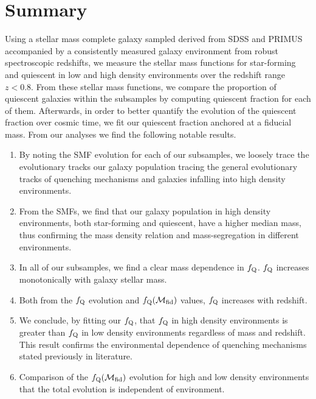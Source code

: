 \documentclass{emulateapj}
\begin{document}
\section{Summary} \label{sec:summary}
Using a stellar mass complete galaxy sampled derived from SDSS and PRIMUS accompanied by a consistently measured galaxy environment from robust spectroscopic redshifts, we measure the stellar mass functions for star-forming and quiescent in low and high density environments over the redshift range $z < 0.8$. From these stellar mass functions, we compare the proportion of quiescent galaxies within the subsamples by computing quiescent fraction for each of them. Afterwards, in order to better quantify the evolution of the quiescent fraction over cosmic time, we fit our quiescent fraction anchored at a fiducial mass. From our analyses we find the following notable results. 

\begin{enumerate}
	\item By noting the SMF evolution for each of our subsamples, we loosely trace the evolutionary tracks our galaxy population tracing the general evolutionary tracks of quenching mechanisms and galaxies infalling into high density environments. 
	\item From the SMFs, we find that our galaxy population in high density environments, both star-forming and quiescent, have a higher median mass, thus confirming the mass density relation and mass-segregation in different environments.
	\item In all of our subsamples, we find a clear mass dependence in $f_{\rm{Q}}$. $f_{\rm{Q}}$ increases monotonically with galaxy stellar mass. 
	\item Both from the $f_{\rm{Q}}$ evolution and $f_{\rm{Q}}(\mathcal{M}_{\rm{fid}})$ values, $f_{\rm{Q}}$ increases with redshift. 
	\item We conclude, by fitting our $f_{\rm{Q}}$, that $f_{\rm{Q}}$ in high density environments is greater than $f_{\rm{Q}}$ in low density environments regardless of mass and redshift. This result confirms the environmental dependence of quenching mechanisms stated previously in literature. 
	\item Comparison of the $f_{\rm{Q}}(\mathcal{M}_{\rm{fid}})$ evolution for high and low density environments that the total evolution is independent of environment. 
\end{enumerate}

\end{document}
